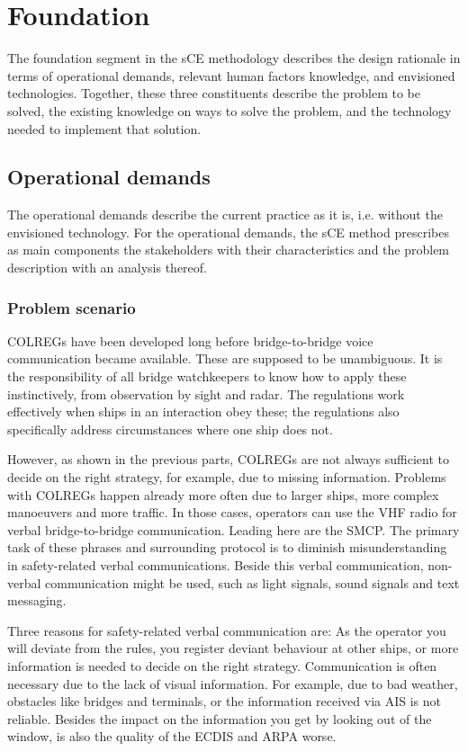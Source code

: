 \chapter{Foundation}
The foundation segment in the \acf{sCE} methodology describes the design rationale in terms of operational demands, relevant human factors knowledge, and envisioned technologies. Together, these three constituents describe the problem to be solved, the existing knowledge on ways to solve the problem, and the technology needed to implement that solution.

\section{Operational demands}
The operational demands describe the current practice as it is, i.e. without the envisioned technology. For the operational demands, the sCE method prescribes as main components the stakeholders with their characteristics and the problem description with an analysis thereof.

\subsection{Problem scenario}
\acf{COLREGs} have been developed long before bridge-to-bridge voice communication became available. These are supposed to be unambiguous. It is the responsibility of all bridge watchkeepers to know how to apply these instinctively, from observation by sight and radar. The regulations work effectively when ships in an interaction obey these; the regulations also specifically address circumstances where one ship does not.

However, as shown in the previous parts, \ac{COLREGs} are not always sufficient to decide on the right strategy, for example, due to missing information. Problems with \ac{COLREGs} happen already more often due to larger ships, more complex manoeuvers and more traffic. In those cases, operators can use the \ac{VHF} radio for verbal bridge-to-bridge communication. Leading here are the \acf{SMCP}. The primary task of these phrases and surrounding protocol is to diminish misunderstanding in safety-related verbal communications. Beside this verbal communication, non-verbal communication might be used, such as light signals, sound signals and text messaging.

Three reasons for safety-related verbal communication are: As the operator you will deviate from the rules, you register deviant behaviour at other ships, or more information is needed to decide on the right strategy. Communication is often necessary due to the lack of visual information. For example, due to bad weather, obstacles like bridges and terminals, or the information received via \ac{AIS} is not reliable. Besides the impact on the information you get by looking out of the window, is also the quality of the \acf{ECDIS} and \acf{ARPA} worse.

